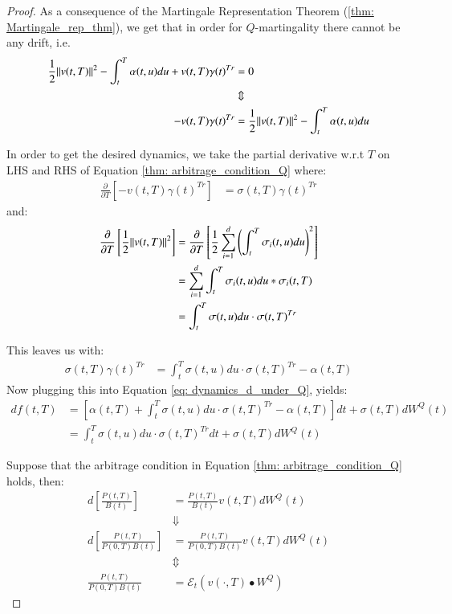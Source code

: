 \begin{proof}
As a consequence of the Martingale Representation Theorem (\ref{thm: Martingale_rep_thm}), we get that in order for $Q$-martingality there cannot be any drift, i.e. 
\begin{align*}
\frac{1}{2}\norm{v(t,T)}^{2} - \int_{t}^{T}\alpha(t,u)du
+ v(t,T)\gamma(t)^{Tr} 
&= 0 \\ 
&\Updownarrow \\ 
-v(t,T)\gamma(t)^{Tr}
&= 
\frac{1}{2}\norm{v(t,T)}^{2} - \int_{t}^{T}\alpha(t,u)du
\end{align*}

\newpage 

In order to get the desired dynamics, we take the partial derivative w.r.t $T$ on LHS and RHS of Equation \ref{thm: arbitrage_condition_Q} where:
\begin{align*}
\frac{\partial}{\partial T}\left[
-v(t,T)\gamma(t)^{Tr}
\right]
&= 
\sigma(t,T)\gamma(t)^{Tr}
\end{align*}
and:
\begin{align*}
\frac{\partial}{\partial T}\left[
\frac{1}{2}\norm{
v(t,T)
}^{2} 
\right]
&= 
\frac{\partial}{\partial T}\left[
\frac{1}{2}\sum_{i=1}^{d}\left(
\int_{t}^{T}\sigma_{i}(t,u)du
\right)^{2}
\right] \\ 
&= \sum_{i=1}^{d}\int_{t}^{T}\sigma_{i}(t,u)du*\sigma_{i}(t,T) \\ 
&= \int_{t}^{T}\sigma(t,u)du\cdot \sigma(t,T)^{Tr}    
\end{align*}

This leaves us with: 
\begin{align*}
\sigma(t,T)\gamma(t)^{Tr} &= 
\int_{t}^{T}\sigma(t,u)du\cdot \sigma(t,T)^{Tr} 
- \alpha(t,T)    
\end{align*}
Now plugging this into Equation \ref{eq: dynamics_d_under_Q}, yields: 
\begin{align*}
df(t,T) &= \left[
\alpha(t,T) + \int_{t}^{T}\sigma(t,u)du\cdot \sigma(t,T)^{Tr} 
- \alpha(t,T)
\right]dt 
+ \sigma(t,T)dW^{Q}(t) \\ 
&= 
\int_{t}^{T}\sigma(t,u)du\cdot \sigma(t,T)^{Tr}
dt 
+ \sigma(t,T)dW^{Q}(t)
\end{align*}

Suppose that the arbitrage condition in Equation \ref{thm: arbitrage_condition_Q} holds, then: 
\begin{align*}
d\left[
\frac{P(t,T)}{B(t)}
\right]
&= 
\frac{P(t,T)}{B(t)}v(t,T)dW^{Q}(t) \\ 
&\Downarrow \\ 
d\left[
\frac{P(t,T)}{P(0,T)B(t)}
\right] 
&= 
\frac{P(t,T)}{P(0,T)B(t)}v(t,T)dW^{Q}(t) \\ 
&\Updownarrow \\ 
\frac{P(t,T)}{P(0,T)B(t)} &= \mathcal{E}_{t}(v(\cdot, T)\bullet W^{Q})
\end{align*}
\end{proof}

